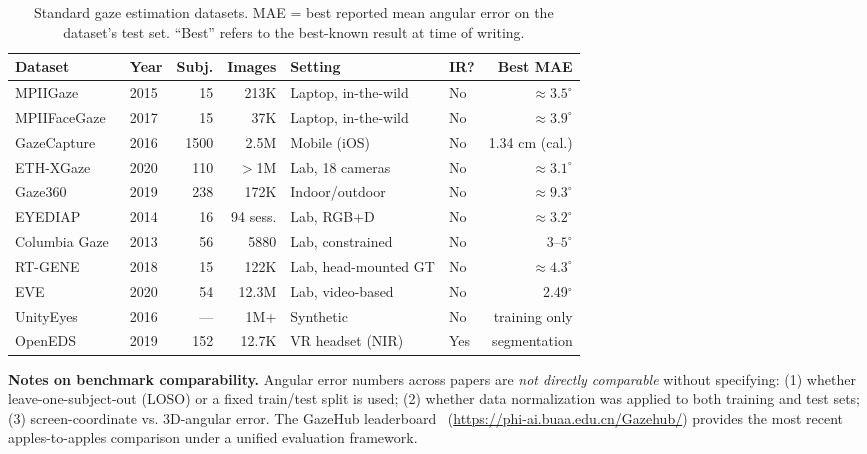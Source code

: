 \documentclass[11pt,a4paper]{article}
\begin{document}
\begin{table}[H]
  \centering
  \caption{Standard gaze estimation datasets. MAE = best reported mean angular error on the dataset's test set. ``Best'' refers to the best-known result at time of writing.}
  \small
  \setlength{\tabcolsep}{5pt}
  \begin{tabular}{llrrllr}
    \toprule
    \textbf{Dataset} & \textbf{Year} & \textbf{Subj.} & \textbf{Images} & \textbf{Setting} & \textbf{IR?} & \textbf{Best MAE} \\
    \midrule
    MPIIGaze~\cite{zhang2019mpiigaze}    & 2015 & 15  & 213K   & Laptop, in-the-wild  & No  & ${\approx}3.5^\circ$ \\
    MPIIFaceGaze~\cite{zhang2017written} & 2017 & 15  & 37K    & Laptop, in-the-wild  & No  & ${\approx}3.9^\circ$ \\
    GazeCapture~\cite{krafka2016eye}     & 2016 & 1500& 2.5M   & Mobile (iOS)         & No  & 1.34 cm (cal.) \\
    ETH-XGaze~\cite{zhang2020ethxgaze}   & 2020 & 110 & $>$1M  & Lab, 18 cameras      & No  & ${\approx}3.1^\circ$ \\
    Gaze360~\cite{kellnhofer2019gaze360} & 2019 & 238 & 172K   & Indoor/outdoor       & No  & ${\approx}9.3^\circ$ \\
    EYEDIAP~\cite{eyediap2014}           & 2014 & 16  & 94 sess.& Lab, RGB+D          & No  & ${\approx}3.2^\circ$ \\
    Columbia Gaze~\cite{smith2013gaze}   & 2013 & 56  & 5880   & Lab, constrained     & No  & $3$--$5^\circ$ \\
    RT-GENE~\cite{fischer2018rtgene}     & 2018 & 15  & 122K   & Lab, head-mounted GT & No  & ${\approx}4.3^\circ$ \\
    EVE~\cite{park2020eve}               & 2020 & 54  & 12.3M  & Lab, video-based     & No  & 2.49$^\circ$ \\
    UnityEyes~\cite{wood2016learning}    & 2016 & ---  & 1M+    & Synthetic            & No  & training only \\
    OpenEDS~\cite{openeds2019}           & 2019 & 152 & 12.7K  & VR headset (NIR)     & Yes & segmentation \\
    \bottomrule
  \end{tabular}
\end{table}

\textbf{Notes on benchmark comparability.}
Angular error numbers across papers are \textit{not directly comparable} without specifying:
(1) whether leave-one-subject-out (LOSO) or a fixed train/test split is used;
(2) whether data normalization was applied to both training and test sets;
(3) screen-coordinate vs. 3D-angular error.
The GazeHub leaderboard~\cite{cheng2024appearance} (\url{https://phi-ai.buaa.edu.cn/Gazehub/}) provides the most recent apples-to-apples comparison under a unified evaluation framework.
\end{document}
